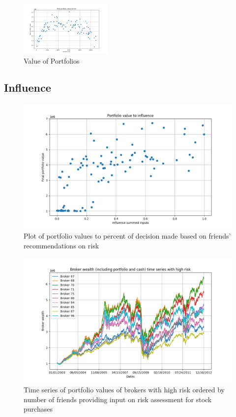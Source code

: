 \documentclass[letterpaper, 10 pt, proceedings]{ieeetran}
\begin{document}
	\begin{figure}[h]
		\centering
		\includegraphics[width=0.4\textwidth]{valueToRisk.png}
		\caption{Value of Portfolios}
		\label{RV}
	\end{figure}
	\FloatBarrier

	
	
	\subsection{Influence}
	
	\begin{figure}[h]
		\centering
		\includegraphics[width=.52\textwidth]{valueToInfluence_influence04.png}
		\caption{Plot of portfolio values to percent of decision made based on friends' recommendations on risk}
		\label{fig:value_to_influence_influencerun}
	\end{figure}	
	
	
	\begin{figure}[h]
		\centering
		\includegraphics[width=.5\textwidth]{timeSeriesJoint_influenceRun04_HighRisk.png}
		\caption{Time series of portfolio values of brokers with high risk ordered by number of friends providing input on risk assessment for stock purchases}
		\label{fig:high_risk_influence_time_series}
	\end{figure}	
\end{document}
